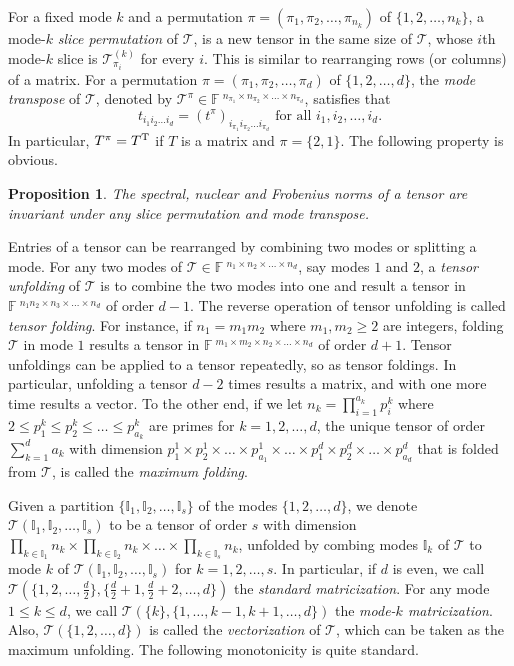 \documentclass[11pt]{article}
\newtheorem{proposition}[theorem]{Proposition}
\newcommand{\BF}{\mathbb{F}\:\!}
\newcommand{\BI}{\mathbb{I}}
\newcommand{\TT}{\mathcal{T}}
\newcommand{\T}{\textnormal{T}}
\begin{document}
For a fixed mode $k$ and a permutation $\pi=(\pi_1,\pi_2,\dots,\pi_{n_k})$ of $\{1,2,\dots,n_k\}$, a mode-$k$ {\em slice permutation} of $\TT$, is a new tensor in the same size of $\TT$, whose $i$th mode-$k$ slice is $\TT^{(k)}_{\pi_i}$ for every $i$. This is similar to rearranging rows (or columns) of a matrix. For a permutation $\pi=(\pi_1,\pi_2,\dots,\pi_d)$ of $\{1,2,\dots,d\}$, the {\em mode transpose} of $\TT$, denoted by $\TT^\pi\in\BF^{n_{\pi_1}\times n_{\pi_2}\times\dots\times n_{\pi_d}}$, satisfies that
$$
t_{i_1i_2\dots i_d} = (t^\pi)_{i_{\pi_1}i_{\pi_2}\dots i_{\pi_d}} \mbox{ for all }i_1,i_2,\dots,i_d.
$$
In particular, $T^\pi=T^{\T}$ if $T$ is a matrix and $\pi=\{2,1\}$. The following property is obvious.

\begin{proposition}\label{thm:permute}
The spectral, nuclear and Frobenius norms of a tensor are invariant under any slice permutation and mode transpose.
\end{proposition}

Entries of a tensor can be rearranged by combining two modes or splitting a mode. For any two modes of $\TT\in\BF^{n_1\times n_2\times\dots\times n_d}$, say modes $1$ and $2$, a {\em tensor unfolding} of $\TT$ is to combine the two modes into one and result a tensor in $\BF^{n_1n_2\times n_3\times \dots\times n_d}$ of order $d-1$. The reverse operation of tensor unfolding is called {\em tensor folding}. For instance, if $n_1=m_1m_2$ where $m_1,m_2\ge2$ are integers, folding $\TT$ in mode $1$ results a tensor in $\BF^{m_1\times m_2\times n_2\times \dots\times n_d}$ of order $d+1$. Tensor unfoldings can be applied to a tensor repeatedly, so as tensor foldings. In particular, unfolding a tensor $d-2$ times results a matrix, and with one more time results a vector. To the other end, if we let $n_k=\prod_{i=1}^{a_k}p^k_i$ where $2\le p^k_1\le p^k_2\le \dots \le p^k_{a_k}$ are primes for $k=1,2,\dots,d$, the unique tensor of order $\sum_{k=1}^da_k$ with dimension $p^1_1\times p^1_2\times\dots\times p^1_{a_1} \times\dots\times p^d_1\times p^d_2\times\dots\times p^d_{a_d}$ that is folded from $\TT$, is called the {\em maximum folding}.

Given a partition $\{\BI_1,\BI_2,\dots,\BI_s\}$ of the modes $\{1,2,\dots,d\}$, we denote $\TT(\BI_1,\BI_2,\dots,\BI_s)$ to be a tensor of order $s$ with dimension $\prod_{k\in\BI_1}n_k \times \prod_{k\in\BI_2}n_k \times \dots \times \prod_{k\in\BI_s}n_k$, unfolded by combing modes $\BI_k$ of $\TT$ to mode $k$ of $\TT(\BI_1,\BI_2,\dots,\BI_s)$ for $k=1,2,\dots,s$. In particular, if $d$ is even, we call $\TT(\{1,2,\dots,\frac{d}{2}\},\{\frac{d}{2}+1,\frac{d}{2}+2,\dots,d\})$ the {\em standard matricization}. For any mode $1\le k\le d$, we call $\TT(\{k\},\{1,\dots,k-1,k+1,\dots,d\})$ the {\em mode-$k$ matricization}. Also, $\TT(\{1,2,\dots,d\})$ is called the {\em vectorization} of $\TT$, which can be taken as the maximum unfolding. The following monotonicity is quite standard.
\end{document}
